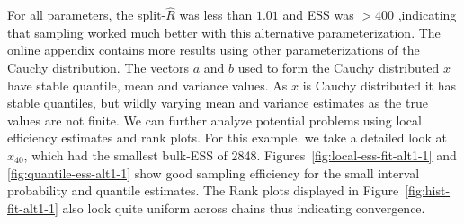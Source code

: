 \documentclass[american,]{article}
\begin{document}

For all parameters, the split-\(\widehat{R}\) was less than \(1.01\) and ESS was \(>400\) ,indicating that
sampling worked much better with this alternative parameterization.
The online appendix contains more results using other parameterizations 
of the Cauchy distribution. The vectors \(a\) and \(b\) used
to form the Cauchy distributed \(x\) have stable quantile, mean and
variance values. As \(x\) is Cauchy distributed it has stable
quantiles, but wildly varying mean and variance estimates as the true values
are not finite.
%
We can further analyze potential problems using local efficiency
estimates and rank plots. For this example. we take a detailed look at 
\(x_{40}\), which had the smallest bulk-ESS of 2848.
%
Figures~\ref{fig:local-ess-fit-alt1-1} and
\ref{fig:quantile-ess-alt1-1} show good sampling efficiency for the
small interval probability and quantile estimates.
%
The Rank plots displayed in Figure~\ref{fig:hist-fit-alt1-1} also look quite 
uniform across chains thus indicating convergence.
\end{document}
